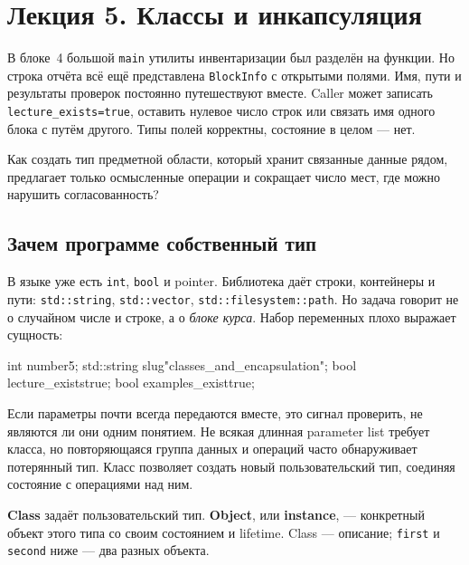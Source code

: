 
\section{Лекция 5. Классы и инкапсуляция}
\label{sec:lecture-05}

В блоке~4 большой \texttt{main} утилиты инвентаризации был разделён на
функции. Но строка отчёта всё ещё представлена \texttt{BlockInfo} с открытыми
полями. Имя, пути и результаты проверок постоянно путешествуют вместе. Caller
может записать \texttt{lecture\_exists=true}, оставить нулевое число строк или
связать имя одного блока с путём другого. Типы полей корректны, состояние в
целом --- нет.

\begin{importantbox}
Как создать тип предметной области, который хранит связанные данные рядом,
предлагает только осмысленные операции и сокращает число мест, где можно
нарушить согласованность?
\end{importantbox}

\subsection{Зачем программе собственный тип}

В языке уже есть \texttt{int}, \texttt{bool} и pointer. Библиотека даёт
строки, контейнеры и пути: \texttt{std::string}, \texttt{std::vector},
\texttt{std::filesystem::path}. Но задача говорит не о случайном числе и
строке, а о \emph{блоке курса}. Набор переменных плохо выражает сущность:

\begin{cppcode}
int number{5};
std::string slug{"classes_and_encapsulation"};
bool lecture_exists{true};
bool examples_exist{true};
\end{cppcode}

Если параметры почти всегда передаются вместе, это сигнал проверить, не
являются ли они одним понятием. Не всякая длинная parameter list требует
класса, но повторяющаяся группа данных и операций часто обнаруживает
потерянный тип. Класс позволяет создать новый пользовательский тип, соединяя
состояние с операциями над ним.

\begin{definition}
\textbf{Class} задаёт пользовательский тип. \textbf{Object}, или
\textbf{instance}, --- конкретный объект этого типа со своим состоянием и
lifetime. Class --- описание; \texttt{first} и \texttt{second} ниже --- два
разных объекта.
\end{definition}

